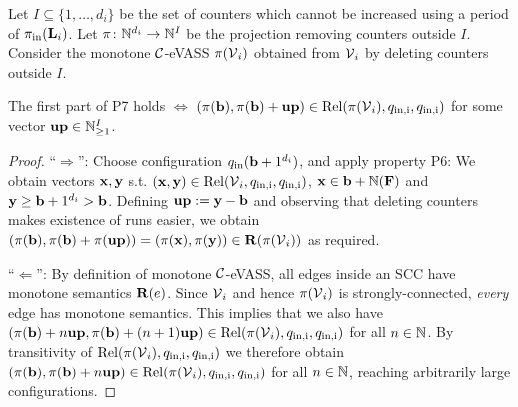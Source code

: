 \begin{lemma} \label{LemmaEquivalentPropertySix}
Let \(I \subseteq \{1,\dots, d_i\}\) be the set of counters which cannot be increased using a period of \(\pi_{\text{in}}(\mathbf{L}_i)\). Let \(\pi \colon \mathbb{N}^{d_i} \to \mathbb{N}^{I}\) be the projection removing counters outside \(I\). Consider the monotone \(\mathcal{C}\)-eVASS \(\pi(\operatorname{\mathcal{V}}_i)\) obtained from \(\operatorname{\mathcal{V}}_i\) by deleting counters outside \(I\). 

The first part of P7 holds \(\iff\) \((\pi(\mathbf{b}), \pi(\mathbf{b})+\mathbf{up}) \in \operatorname{Rel}(\pi(\operatorname{\mathcal{V}}_i), q_{\text{in,i}}, q_{\text{in,i}})\) for some vector \(\mathbf{up} \in \mathbb{N}_{\geq 1}^{I}\).
\end{lemma}

\begin{proof}
``\(\Rightarrow\)'': Choose configuration \(q_{\text{in}}(\mathbf{b}+1^{d_i})\), and apply property P6: We obtain vectors \(\mathbf{x}, \mathbf{y}\) s.t. \((\mathbf{x}, \mathbf{y}) \in \operatorname{Rel}(\operatorname{\mathcal{V}}_i, q_{\text{in,i}}, q_{\text{in,i}})\),  \(\mathbf{x} \in \mathbf{b}+\mathbb{N}(\mathbf{F})\) and \(\mathbf{y} \geq \mathbf{b}+1^{d_i} > \mathbf{b}\). Defining \(\mathbf{up}:=\mathbf{y}-\mathbf{b}\) and observing that deleting counters makes existence of runs easier, we obtain \((\pi(\mathbf{b}), \pi(\mathbf{b})+\pi(\mathbf{up}))=(\pi(\mathbf{x}), \pi(\mathbf{y})) \in \mathbf{R}(\pi(\operatorname{\mathcal{V}}_i))\) as required.

``\(\Leftarrow\)'': By definition of monotone \(\mathcal{C}\)-eVASS, all edges inside an SCC have monotone semantics \(\mathbf{R}(e)\). Since \(\operatorname{\mathcal{V}}_i\) and hence \(\pi(\operatorname{\mathcal{V}}_i)\) is strongly-connected, \emph{every} edge has monotone semantics. This implies that we also have \((\pi(\mathbf{b})+n\mathbf{up}, \pi(\mathbf{b})+(n+1)\mathbf{up}) \in \operatorname{Rel}(\pi(\operatorname{\mathcal{V}}_i), q_{\text{in,i}}, q_{\text{in,i}})\) for all \(n \in \mathbb{N}\). By transitivity of \(\operatorname{Rel}(\pi(\operatorname{\mathcal{V}}_i), q_{\text{in,i}}, q_{\text{in,i}})\) we therefore obtain \((\pi(\mathbf{b}), \pi(\mathbf{b})+n\mathbf{up}) \in \operatorname{Rel}(\pi(\operatorname{\mathcal{V}}_i), q_{\text{in,i}}, q_{\text{in,i}})\) for all \(n \in \mathbb{N}\), reaching arbitrarily large configurations.


\end{proof}
